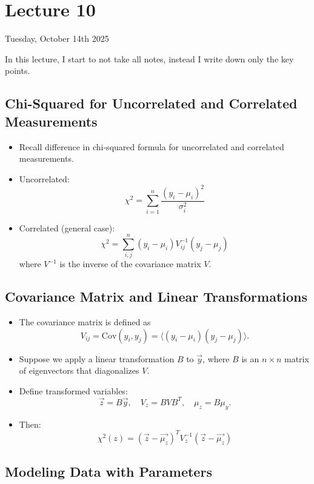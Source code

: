 \section{Lecture 10}

Tuesday, October 14th 2025

In this lecture, I start to not take all notes, instead I write down only the key points.

\subsection{Chi-Squared for Uncorrelated and Correlated Measurements}

\begin{itemize}
    \item Recall difference in chi-squared formula for uncorrelated and correlated measurements.
    \item Uncorrelated:
          \[
              \chi^2 = \sum_{i=1}^{n} \frac{(y_i - \mu_i)^2}{\sigma_i^2}
          \]
    \item Correlated (general case):
          \[
              \chi^2 = \sum_{i, j}^{n} (y_i - \mu_i) V^{-1}_{ij} (y_j - \mu_j)
          \]
          where $V^{-1}$ is the inverse of the covariance matrix $V$.
\end{itemize}

\subsection{Covariance Matrix and Linear Transformations}

\begin{itemize}
    \item The covariance matrix is defined as
          \[
              V_{ij} = \mathrm{Cov}(y_i, y_j) = \langle (y_i - \mu_i)(y_j - \mu_j) \rangle .
          \]
    \item Suppose we apply a linear transformation $B$ to $\vec{y}$, where $B$ is an $n \times n$ matrix of eigenvectors that diagonalizes $V$.
    \item Define transformed variables:
          \[
              \vec{z} = B \vec{y}, \quad V_z = B V B^T, \quad \mu_z = B \mu_y .
          \]
    \item Then:
          \[
              \boxed{\chi^2(z) = \left( \vec{z} - \vec{\mu_z} \right)^T V_z^{-1} \left( \vec{z} - \vec{\mu_z} \right)}
          \]
\end{itemize}

\subsection{Modeling Data with Parameters}

